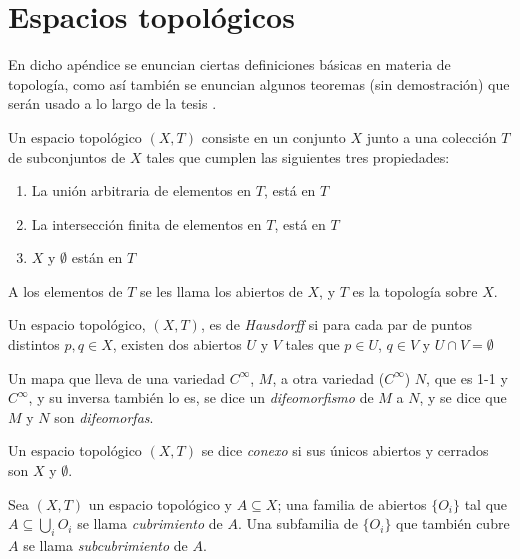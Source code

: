 ﻿\chapter{Espacios topológicos}\label{esptopologicos}

En dicho apéndice se enuncian ciertas definiciones básicas en materia de topología, como así también se enuncian algunos teoremas (sin demostración) que serán usado a lo largo de la tesis .


\begin{definition}{}
Un espacio topológico $(X,T)$ consiste en un conjunto $X$ junto a una colección $T$ de subconjuntos de $X$ tales que cumplen las siguientes tres propiedades:
\begin{enumerate}
\item La unión arbitraria de elementos en $T$, está en $T$ 
\item La intersección finita de elementos en $T$, está en $T$
\item $X$ y $\emptyset$ están en $T$
\end{enumerate}
A los elementos de $T$ se les llama los abiertos de $X$, y $T$ es la topología sobre $X$.
\end{definition}


\begin{definition}
Un espacio topológico, $(X,T)$, es de \textit{Hausdorff} si para cada par de puntos distintos $p,q\in X$, existen dos abiertos $U$ y $V$ tales que $p\in U$, $q\in V$ y  $U\cap V=\emptyset$
\end{definition}

\begin{definition}
Un mapa que lleva de una variedad $C^\infty$, $M$, a otra variedad ($C^\infty$) $N$, que es 1-1 y $C^\infty$, y su inversa también lo es, se dice un \textit{difeomorfismo} de $M$ a $N$, y se dice que $M$ y $N$ son \textit{difeomorfas}. 
\end{definition}

\begin{definition}
Un espacio topológico $(X,T)$ se dice \textit{conexo} si sus únicos abiertos y cerrados son $X$ y $\emptyset$.
\end{definition}

\begin{definition}
Sea $(X,T)$ un espacio topológico y $A\subseteq X$; una familia de abiertos $\{O_i\}$ tal que $A\subseteq\bigcup_{i}O_i$ se llama \textit{cubrimiento} de $A$. Una subfamilia de $\{O_i\}$ que también cubre $A$ se llama \textit{subcubrimiento} de $A$.
\end{definition}


